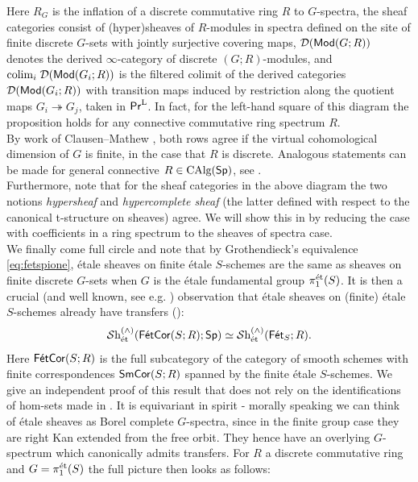 \documentclass[reqno]{amsart}
\numberwithin{equation}{section}\theoremstyle{thms}
\theoremstyle{defn}
\newcommand{\cD}{\mathcal{D}}
\newcommand{\tn}[1]{\textnormal{#1}}
\newcommand{\tsf}[1]{\textsf{\textup{#1}}}
\newcommand{\mcal}[1]{\mathcal{#1}}
\newcommand{\sheaves}{\mcal{S}\tn{h}}
\newcommand{\calg}{\tn{CAlg}}
\newcommand{\modgr}{\tsf{Mod}(G;R)}
\newcommand{\Mod}{\tsf{Mod}}
\newcommand{\spec}{\tsf{Sp}}
\newcommand{\prl}{\tsf{Pr}^{\tn{L}}}
\newcommand{\fets}{\tsf{Fét}_S}
\newcommand{\corsms}[1]{\tsf{SmCor}(S;#1)}
\newcommand{\corfets}[1]{\tsf{FétCor}(S;#1)}
\begin{document}
\noindent Here $R_G$ is the inflation of a discrete commutative ring $R$ to $G$-spectra, the sheaf categories consist of (hyper)sheaves of $R$-modules in spectra defined on the site of finite discrete $G$-sets with jointly surjective covering maps, $\cD(\modgr)$ denotes the derived $\infty$-category of discrete $(G;R)$-modules, and $\tn{colim}_i \; \cD(\Mod(G_i;R))$ is the filtered colimit of the derived categories $\cD(\Mod(G_i;R))$ with transition maps induced by restriction along the quotient maps $G_i \twoheadrightarrow G_j$, taken in $\prl$. In fact, for the left-hand square of this diagram the proposition holds for any connective commutative ring spectrum $R$. \\
By work of Clausen--Mathew \cite[§4.1]{cm21}, both rows agree if the virtual cohomological dimension of $G$ is finite, in the case that $R$ is discrete. Analogous statements can be made for general connective $R \in \calg(\spec)$, see . \\
Furthermore, note that for the sheaf categories in the above diagram the two notions \emph{hypersheaf} and \emph{hypercomplete sheaf} (the latter defined with respect to the canonical t-structure on sheaves) agree. We will show this in  by reducing the case with coefficients in a ring spectrum to the sheaves of spectra case. \\

\noindent We finally come full circle and note that by Grothendieck's equivalence \ref{eq:fetspione}, étale sheaves on finite étale $S$-schemes are the same as sheaves on finite discrete $G$-sets when $G$ is the étale fundamental group $\pi_1^{\tn{ét}}(S)$. It is then a crucial (and well known, see e.g. \cite[Proposition 3.1.4]{cd16}) observation that étale sheaves on (finite) étale $S$-schemes already have transfers ():
$$\sheaves_{\tn{ét}}^{(\wedge)}(\corfets{R};\spec) \simeq \sheaves_{\tn{ét}}^{(\wedge)}(\fets;R).$$
Here $\corfets{R}$ is the full subcategory of the category of smooth schemes with finite correspondences $\corsms{R}$ spanned by the finite étale $S$-schemes. We give an independent proof of this result that does not rely on the identifications of hom-sets made in \cite{cd16}. It is equivariant in spirit - morally speaking we can think of étale sheaves as Borel complete $G$-spectra, since in the finite group case they are right Kan extended from the free orbit. They hence have an overlying $G$-spectrum which canonically admits transfers. For $R$ a discrete commutative ring and $G=\pi_1^{\tn{ét}}(S)$ the full picture then looks as follows:
\end{document}
